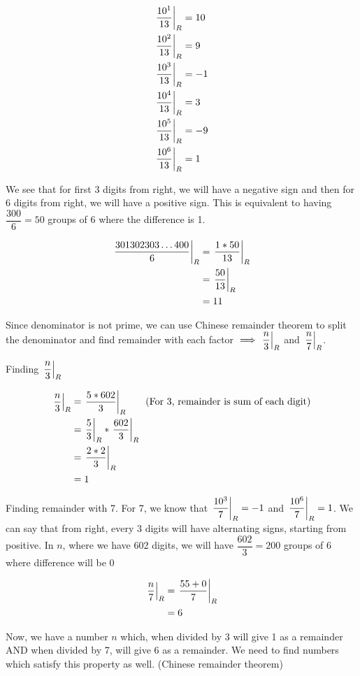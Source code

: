 \begin{align*}
    \displaystyle{ \left. \frac{10^1}{13} \right |_{R} } &= 10 \\
    \displaystyle{ \left. \frac{10^2}{13} \right |_{R} } &= 9 \\
    \displaystyle{ \left. \frac{10^3}{13} \right |_{R} } &= -1 \\
    \displaystyle{ \left. \frac{10^4}{13} \right |_{R} } &= 3 \\
    \displaystyle{ \left. \frac{10^5}{13} \right |_{R} } &= -9 \\
    \displaystyle{ \left. \frac{10^6}{13} \right |_{R} } &= 1 
\end{align*}

We see that for first 3 digits from right, we will have a negative sign and then for 6 digits from right, we will have a positive sign. This is equivalent to having $\dfrac{300}{6} = 50$ groups of 6 where the difference is 1. 

\begin{align*}
    \displaystyle{ \left. \frac{301302303\ldots400}{6} \right |_{R} } &= \displaystyle{ \left. \frac{1 * 50}{13} \right |_{R} } \\
    &= \displaystyle{ \left. \frac{50}{13} \right |_{R} } \\
    &= 11
\end{align*}


Since denominator is not prime, we can use Chinese remainder theorem to split the denominator and find remainder with each factor $\implies \displaystyle{ \left. \frac{n}{3} \right |_{R} }$ and $\displaystyle{ \left. \frac{n}{7} \right |_{R} }$. 

Finding $\displaystyle{ \left. \frac{n}{3} \right |_{R} }$

\begin{align*}
    \displaystyle{ \left. \frac{n}{3} \right |_{R} } &= \displaystyle{ \left. \frac{5 * 602}{3} \right |_{R} } \tag{For 3, remainder is sum of each digit} \\
    &= \displaystyle{ \left. \frac{5}{3} \right |_{R} } * \displaystyle{ \left. \frac{602}{3} \right |_{R} } \\
    &= \displaystyle{ \left. \frac{2 * 2}{3} \right |_{R} } \\
    &= 1
\end{align*}

Finding remainder with 7. For 7, we know that $\displaystyle{ \left. \frac{10^3}{7} \right |_{R} } = -1$ and $\displaystyle{ \left. \frac{10^6}{7} \right |_{R} } = 1$. We can say that from right, every 3 digits will have alternating signs, starting from positive. In $n$, where we have 602 digits, we will have $\dfrac{602}{3} = 200$ groups of 6 where difference will be 0

\begin{align*}
    \displaystyle{ \left. \frac{n}{7} \right |_{R} } &= \displaystyle{ \left. \frac{55 + 0}{7} \right |_{R} } \\
    &= 6
\end{align*}

Now, we have a number $n$ which, when divided by 3 will give 1 as a remainder AND when divided by 7, will give 6 as a remainder. We need to find numbers which satisfy this property as well. (Chinese remainder theorem)


